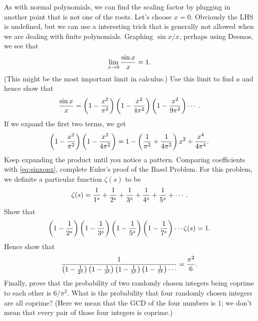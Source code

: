 As with normal polynomials, we can find the scaling factor by plugging in another point that
is not one of the roots. Let's choose $x=0$. Obviously the LHS is undefined, but we can use
a interesting trick that is  generally not allowed when we are dealing with finite polynomials.
Graphing $\sin x/x$, perhaps using Desmos, we see that
$$\lim_{x\to0}{\sin x\over x}=1.$$
(This might be the most important limit in calculus.) Use this limit to find $a$
and hence  show that
$${\sin x\over x}=\left(1-{x^2\over\pi^2}\right)\left(1-{x^2\over4\pi^2}\right)\left(1-{x^2\over9\pi^2}\right)\cdots.$$
\li If we expand the first two terms, we get
$$\left(1-{x^2\over\pi^2}\right)\left(1-{x^2\over4\pi^2}\right)=1-\left({1\over\pi^2}+{1\over4\pi^2}\right)x^2+{x^4\over4\pi^4}.$$
Keep expanding the product until you notice a pattern.
\li Comparing coefficients with \eqref{eq:sinxonx}, complete Euler's proof of the Basel Problem.
\endnumberedlist
\li For this problem, we definite a particular function $\zeta(s)$ to be
$$\zeta(s)={1\over1^s}+{1\over2^s}+{1\over3^s}+{1\over4^s}+{1\over5^s}+\cdots.$$
\numberedlist
\li Show that
$$\left(1-{1\over2^s}\right)\left(1-{1\over3^s}\right)\left(1-{1\over5^s}\right)\left(1-{1\over7^s}\right)\cdots\zeta(s)=1.$$
\li Hence show that
$${1\over{\left(1-{1\over2^2}\right)\left(1-{1\over3^2}\right)\left(1-{1\over5^2}\right)\left(1-{1\over7^2}\right)\cdots}}={\pi^2\over6}.$$
\li Finally, prove that the probability of two randomly chosen integers being coprime to each other is $6/\pi^2.$
\li What is the probability that four randomly chosen integers are all coprime? (Here we mean that the GCD of the four
numbers is $1$; we don't mean that every pair of those four integers is coprime.)
\endnumberedlist
\endnumberedlist
\bye
